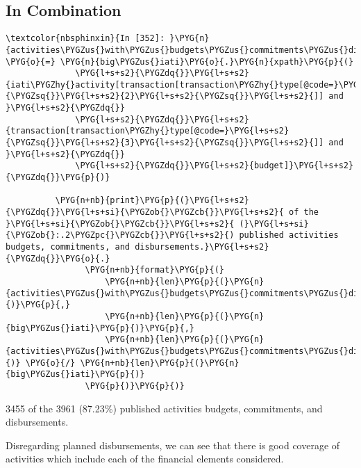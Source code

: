 \documentclass[letterpaper,10pt,english]{sphinxmanual}
\begin{document}
\subsection{In Combination}
\label{\detokenize{Global Affairs Canada - Compliance Report:In-Combination}}
\begin{Verbatim}[commandchars=\\\{\}]
\textcolor{nbsphinxin}{In [352]: }\PYG{n}{activities\PYGZus{}with\PYGZus{}budgets\PYGZus{}commitments\PYGZus{}disbursements} \PYG{o}{=} \PYG{n}{big\PYGZus{}iati}\PYG{o}{.}\PYG{n}{xpath}\PYG{p}{(}
              \PYG{l+s+s2}{\PYGZdq{}}\PYG{l+s+s2}{iati\PYGZhy{}activity[transaction[transaction\PYGZhy{}type[@code=}\PYG{l+s+s2}{\PYGZsq{}}\PYG{l+s+s2}{2}\PYG{l+s+s2}{\PYGZsq{}}\PYG{l+s+s2}{]] and }\PYG{l+s+s2}{\PYGZdq{}}
              \PYG{l+s+s2}{\PYGZdq{}}\PYG{l+s+s2}{transaction[transaction\PYGZhy{}type[@code=}\PYG{l+s+s2}{\PYGZsq{}}\PYG{l+s+s2}{3}\PYG{l+s+s2}{\PYGZsq{}}\PYG{l+s+s2}{]] and }\PYG{l+s+s2}{\PYGZdq{}}
              \PYG{l+s+s2}{\PYGZdq{}}\PYG{l+s+s2}{budget]}\PYG{l+s+s2}{\PYGZdq{}}\PYG{p}{)}
          
          \PYG{n+nb}{print}\PYG{p}{(}\PYG{l+s+s2}{\PYGZdq{}}\PYG{l+s+si}{\PYGZob{}\PYGZcb{}}\PYG{l+s+s2}{ of the }\PYG{l+s+si}{\PYGZob{}\PYGZcb{}}\PYG{l+s+s2}{ (}\PYG{l+s+si}{\PYGZob{}:.2\PYGZpc{}\PYGZcb{}}\PYG{l+s+s2}{) published activities budgets, commitments, and disbursements.}\PYG{l+s+s2}{\PYGZdq{}}\PYG{o}{.}
                \PYG{n+nb}{format}\PYG{p}{(}
                    \PYG{n+nb}{len}\PYG{p}{(}\PYG{n}{activities\PYGZus{}with\PYGZus{}budgets\PYGZus{}commitments\PYGZus{}disbursements}\PYG{p}{)}\PYG{p}{,}
                    \PYG{n+nb}{len}\PYG{p}{(}\PYG{n}{big\PYGZus{}iati}\PYG{p}{)}\PYG{p}{,}
                    \PYG{n+nb}{len}\PYG{p}{(}\PYG{n}{activities\PYGZus{}with\PYGZus{}budgets\PYGZus{}commitments\PYGZus{}disbursements}\PYG{p}{)} \PYG{o}{/} \PYG{n+nb}{len}\PYG{p}{(}\PYG{n}{big\PYGZus{}iati}\PYG{p}{)}
                \PYG{p}{)}\PYG{p}{)}
\end{Verbatim}
%
\begin{OriginalVerbatim}[commandchars=\\\{\}]
3455 of the 3961 (87.23\%) published activities budgets, commitments, and disbursements.
\end{OriginalVerbatim}
\relax
Disregarding planned disbursements, we can see that there is good
coverage of activities which include each of the financial elements
considered.
\end{document}
